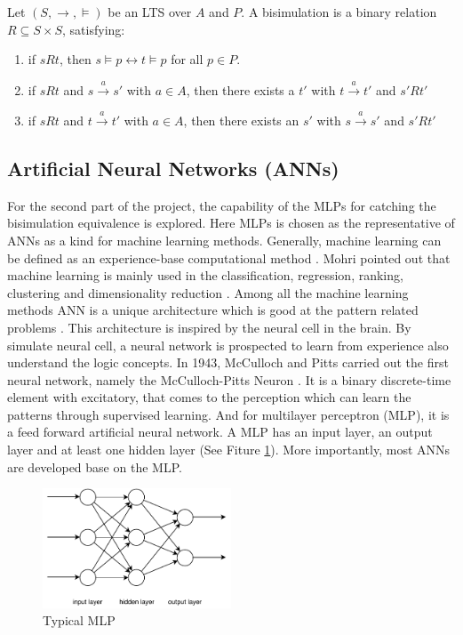 \begin{defin}
Let $(S, \rightarrow, \models)$ be an LTS over $A$ and $P$. A bisimulation is a binary relation $R \subseteq S \times S$, satisfying:
\renewcommand{\labelenumi}{\arabic{enumi})}
\begin{enumerate}
    \item if $sRt$, then $s \models p \leftrightarrow t \models p$ for all $p\in P$.
    \item if $sRt$ and $s \stackrel{a}{\rightarrow}s'$ with $a \in A$, then there exists a $t'$ with $t \stackrel{a}{\rightarrow} t'$ and $s'Rt'$
    \item if $sRt$ and $t \stackrel{a}{\rightarrow} t'$ with $a\in A$, then there exists an $s'$ with $s \stackrel{a}{\rightarrow}s'$ and $s'Rt'$
\end{enumerate}
\end{defin}


\subsection{Artificial Neural Networks (ANNs)}
For the second part of the project, the capability of the MLPs for catching the bisimulation equivalence is explored. 
Here MLPs is chosen as the representative of ANNs as a kind for machine learning methods.
Generally, machine learning can be defined as an experience-base computational method \cite{Mohri2013}.
Mohri pointed out that machine learning is mainly used in the classification, regression, ranking, clustering and dimensionality reduction \cite{Mohri2013}.
Among all the machine learning methods ANN is a unique architecture which is good at the pattern related problems \cite{Dayhoff1990}.
This architecture is inspired by the neural cell in the brain. 
By simulate neural cell, a neural network is prospected to learn from experience also understand the logic concepts. 
In 1943, McCulloch and Pitts carried out the first neural network, namely the McCulloch-Pitts Neuron \cite{Dayhoff1990}. 
It is a binary discrete-time element with excitatory, that comes to the perception which can learn the patterns through supervised learning.
And for multilayer perceptron (MLP), it is a feed forward artificial neural network.
A MLP has an input layer, an output layer and at least one hidden layer \cite{rosenblatt1961principles} (See Fiture \ref{fig:mlp}).
More importantly, most ANNs are developed base on the MLP.

\begin{figure}[h]
    \centering
    \includegraphics[width=0.5\textwidth]{img/eg_mlp.pdf}
    \caption{Typical MLP}
    \label{fig:mlp}
\end{figure}

